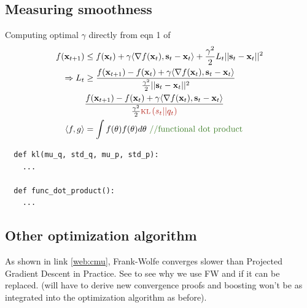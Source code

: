 \subsection{Measuring smoothness}
\INPROGRESS
Computing optimal $\gamma$ directly
from eqn 1 of \cite{pedregosa2018step}
\begin{align*}
  f(\bx_{t+1}) &\leq f(\bx_t) + \gamma \langle \grad f(\bx_t), \bs_t - \bx_t \rangle 
  + \frac{\gamma^2}{2}L_t ||\bs_t - \bx_t||^2 \\
  \Rightarrow L_t &\geq \frac{f(\bx_{t+1}) - f(\bx_t) 
  + \gamma \langle \grad f(\bx_t), \bs_t - \bx_t \rangle}
  {\frac{\gamma^2}{2}||\bs_t - \bx_t||^2}  \\
                  &\frac{f(\bx_{t+1}) - f(\bx_t) 
                  + \gamma \langle \grad f(\bx_t), \bs_t - \bx_t \rangle}
                  {\frac{\gamma^2}{2} \red{\kl{s_t || q_t}}}  \\
    \langle f, g \rangle &= \int f(\theta) f(\theta) d\theta 
    \text{  \comment{//functional dot product}}\\
  \end{align*}
  \begin{verbatim}
  def kl(mu_q, std_q, mu_p, std_p):
    ...

  def func_dot_product():
    ...
  \end{verbatim}

  \subsection{Other optimization algorithm}
  \TODO
  As shown in link \ref{web:cmu}, Frank-Wolfe converges slower than Projected 
  Gradient Descent in Practice. See \cite{locatello2017boosting} to see why we use
  FW and if it can be replaced. (will have to derive new convergence proofs and
  boosting won't be as integrated into the optimization algorithm as before).

